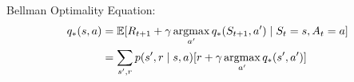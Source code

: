 Bellman Optimality Equation:
\begin{equation}\label{eq:bellman}
    \begin{aligned}
    q_*(s,a) &= \operatorname{\mathbb{E}} [R_{t+1} + \gamma \operatorname*{argmax}_{a'}q_*(S_{t+1}, a') \mid S_t = s, A_t = a] \\
    &= \sum_{s',r}p(s', r\mid s, a)[r + \gamma \operatorname*{argmax}_{a'}q_*(s', a')]
    \end{aligned}
\end{equation}